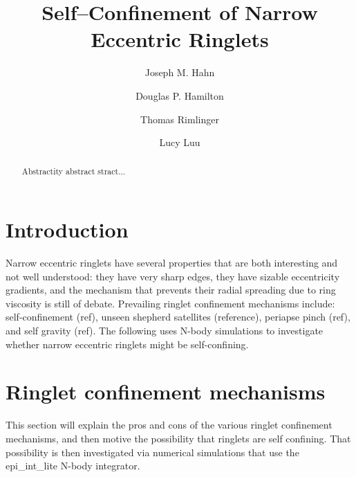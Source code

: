 \documentclass[preprint]{aastex62}
\begin{document}
\title{Self--Confinement of Narrow Eccentric Ringlets}


\author{Joseph M. Hahn}

\author{Douglas P. Hamilton}

\author{Thomas Rimlinger}

\author{Lucy Luu}


\begin{abstract}

Abstractity abstract stract...

\end{abstract}



\section{Introduction} \label{sec:intro}

Narrow eccentric ringlets have several properties that are both interesting and
not well understood: they have very sharp edges,
they have sizable eccentricity gradients, and the mechanism that
prevents their radial spreading due to ring viscosity is still of debate.
Prevailing ringlet confinement mechanisms include: self-confinement (ref),
unseen shepherd satellites (reference), periapse pinch (ref), and self gravity (ref).
The following uses N-body simulations to investigate whether narrow
eccentric ringlets might be self-confining.

\section{Ringlet confinement mechanisms} \label{sec:confinement}

This section will explain the pros and cons of the various ringlet confinement mechanisms,
and then motive the possibility that ringlets are self confining. That possibility
is then investigated via numerical simulations that use the epi\_int\_lite N-body integrator.
\end{document}
